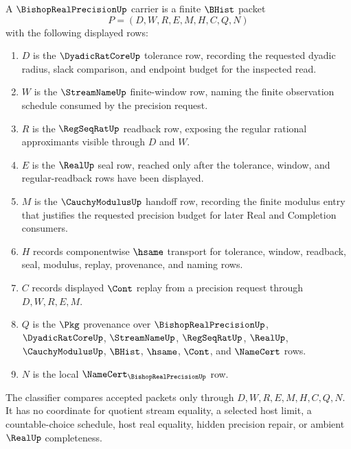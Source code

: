 \begin{definition}
\label{def:bishop-real-precision-carrier}
A $\BishopRealPrecisionUp$ carrier is a finite $\BHist$ packet
$$
P=(D,W,R,E,M,H,C,Q,N)
$$
with the following displayed rows:
\begin{enumerate}
\item $D$ is the $\DyadicRatCoreUp$ tolerance row, recording the requested dyadic radius, slack comparison, and endpoint budget for the inspected read.
\item $W$ is the $\StreamNameUp$ finite-window row, naming the finite observation schedule consumed by the precision request.
\item $R$ is the $\RegSeqRatUp$ readback row, exposing the regular rational approximants visible through $D$ and $W$.
\item $E$ is the $\RealUp$ seal row, reached only after the tolerance, window, and regular-readback rows have been displayed.
\item $M$ is the $\CauchyModulusUp$ handoff row, recording the finite modulus entry that justifies the requested precision budget for later Real and Completion consumers.
\item $H$ records componentwise $\hsame$ transport for tolerance, window, readback, seal, modulus, replay, provenance, and naming rows.
\item $C$ records displayed $\Cont$ replay from a precision request through $D,W,R,E,M$.
\item $Q$ is the $\Pkg$ provenance over $\BishopRealPrecisionUp$, $\DyadicRatCoreUp$, $\StreamNameUp$, $\RegSeqRatUp$, $\RealUp$, $\CauchyModulusUp$, $\BHist$, $\hsame$, $\Cont$, and $\NameCert$ rows.
\item $N$ is the local $\NameCert_{\BishopRealPrecisionUp}$ row.
\end{enumerate}
The classifier compares accepted packets only through $D,W,R,E,M,H,C,Q,N$. It has no coordinate for quotient stream equality, a selected host limit, a countable-choice schedule, host real equality, hidden precision repair, or ambient $\RealUp$ completeness.
\end{definition}

